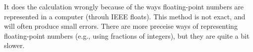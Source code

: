 \inputminted{csharp}{\context/answer/DailyDiffs.cs}

It does the calculation wrongly because of the ways floating-point numbers are represented in a computer (throuh IEEE floats). This method is not exact, and will often produce small errors. There are more preceise ways of representing floating-point numbers (e.g., using fractions of integers), but they are quite a bit slower.
